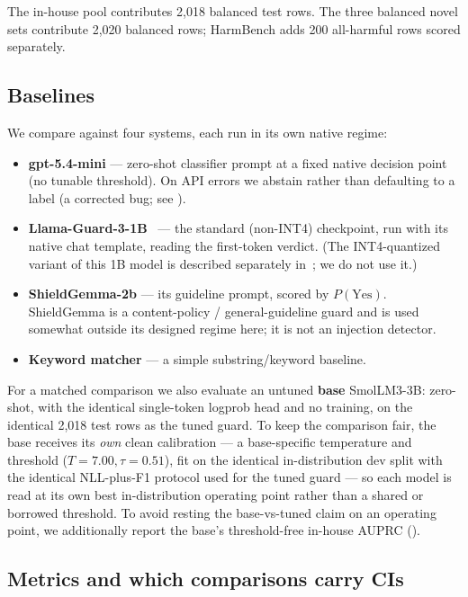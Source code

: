 \documentclass[sigconf,nonacm]{acmart}
\begin{document}
The in-house pool contributes 2,018 balanced test rows. The three balanced novel sets contribute 2,020 balanced rows; HarmBench adds 200 all-harmful rows scored separately.

\subsection{Baselines}

We compare against four systems, each run in its own native regime:

\begin{itemize}
  \item \textbf{gpt-5.4-mini} --- zero-shot classifier prompt at a fixed native decision point (no tunable threshold). On API errors we abstain rather than defaulting to a label (a corrected bug; see ).
  \item \textbf{Llama-Guard-3-1B}~\cite{meta2024llamaguard2_3} --- the standard (non-INT4) checkpoint, run with its native chat template, reading the first-token verdict. (The INT4-quantized variant of this 1B model is described separately in~\cite{fedorov2024llamaguard3_1b}; we do not use it.)
  \item \textbf{ShieldGemma-2b} --- its guideline prompt, scored by $P(\text{Yes})$. ShieldGemma is a content-policy / general-guideline guard and is used somewhat outside its designed regime here; it is not an injection detector.
  \item \textbf{Keyword matcher} --- a simple substring/keyword baseline.
\end{itemize}

For a matched comparison we also evaluate an untuned \textbf{base} SmolLM3-3B: zero-shot, with the identical single-token logprob head and no training, on the identical 2,018 test rows as the tuned guard. To keep the comparison fair, the base receives its \emph{own} clean calibration --- a base-specific temperature and threshold ($T{=}7.00,\tau{=}0.51$), fit on the identical in-distribution dev split with the identical NLL-plus-F1 protocol used for the tuned guard --- so each model is read at its own best in-distribution operating point rather than a shared or borrowed threshold. To avoid resting the base-vs-tuned claim on an operating point, we additionally report the base's threshold-free in-house AUPRC ().

\subsection{Metrics and which comparisons carry CIs}
\label{sec:metrics}
\end{document}
